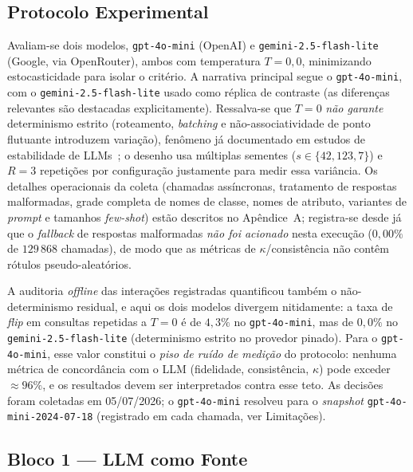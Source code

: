 \documentclass[12pt,a4paper]{article}
\begin{document}
\bigskip


\subsection{Protocolo Experimental}

Avaliam-se dois modelos, \texttt{gpt-4o-mini} (OpenAI) e \texttt{gemini-2.5-flash-lite}
(Google, via OpenRouter), ambos com temperatura $T = 0{,}0$, minimizando estocasticidade
para isolar o critério. A narrativa principal segue o \texttt{gpt-4o-mini}, com o
\texttt{gemini-2.5-flash-lite} usado como réplica de contraste (as diferenças relevantes
são destacadas explicitamente). Ressalva-se que $T=0$ \emph{não garante} determinismo
estrito (roteamento, \emph{batching} e não-associatividade de ponto flutuante introduzem
variação), fenômeno já documentado em estudos de estabilidade de
LLMs~\cite{atilLLMStability2024, windischOneRun2026}; o desenho usa múltiplas sementes
($s \in \{42, 123, 7\}$) e $R = 3$ repetições por configuração justamente para medir essa
variância. Os detalhes operacionais da coleta (chamadas assíncronas, tratamento de
respostas malformadas, grade completa de nomes de classe, nomes de atributo, variantes de
\emph{prompt} e tamanhos \emph{few-shot}) estão descritos no Apêndice~A;
registra-se desde já que o \emph{fallback} de respostas malformadas \emph{não foi
acionado} nesta execução ($0{,}00\%$ de $129\,868$ chamadas), de modo que as métricas de
$\kappa$/consistência não contêm rótulos pseudo-aleatórios.

A auditoria \emph{offline} das interações registradas quantificou também o não-determinismo
residual, e aqui os dois modelos divergem nitidamente: a taxa de \emph{flip} em consultas
repetidas a $T=0$ é de $4{,}3\%$ no \texttt{gpt-4o-mini}, mas de $0{,}0\%$ no
\texttt{gemini-2.5-flash-lite} (determinismo estrito no provedor pinado). Para o
\texttt{gpt-4o-mini}, esse valor constitui o \emph{piso de ruído de medição} do protocolo:
nenhuma métrica de concordância com o LLM (fidelidade, consistência, $\kappa$) pode exceder
$\approx 96\%$, e os resultados devem ser interpretados contra esse teto. As decisões foram
coletadas em 05/07/2026; o \texttt{gpt-4o-mini} resolveu para o \emph{snapshot}
\texttt{gpt-4o-mini-2024-07-18} (registrado em cada chamada, ver Limitações).

\subsection{Bloco 1 — LLM como Fonte}
\end{document}
